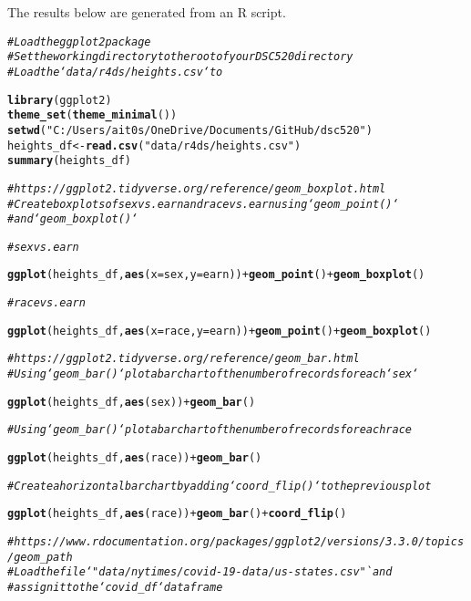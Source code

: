 \documentclass{article}\usepackage[]{graphicx}\usepackage[]{xcolor}
\makeatletter
\newcommand{\hlstr}[1]{\textcolor[rgb]{0.192,0.494,0.8}{#1}}%
\newcommand{\hlcom}[1]{\textcolor[rgb]{0.678,0.584,0.686}{\textit{#1}}}%
\newcommand{\hlkwd}[1]{\textcolor[rgb]{0.737,0.353,0.396}{\textbf{#1}}}%
\newenvironment{kframe}{%
 \def\at@end@of@kframe{}%
 \ifinner\ifhmode%
  \def\at@end@of@kframe{\end{minipage}}%
  \begin{minipage}{\columnwidth}%
 \fi\fi%
 \def\FrameCommand##1{\hskip\@totalleftmargin \hskip-\fboxsep
 \colorbox{shadecolor}{##1}\hskip-\fboxsep
     \hskip-\linewidth \hskip-\@totalleftmargin \hskip\columnwidth}%
 \MakeFramed {\advance\hsize-\width
   \@totalleftmargin\z@ \linewidth\hsize
   \@setminipage}}%
 {\par\unskip\endMakeFramed%
 \at@end@of@kframe}
\newenvironment{knitrout}{}{} %
\makeatother
\begin{document}
The results below are generated from an R script.

\begin{knitrout}
\color{fgcolor}\begin{kframe}
\begin{alltt}
\hlcom{# Load the ggplot2 package}
\hlcom{# Set the working directory to the root of your DSC 520 directory}
\hlcom{# Load the `data/r4ds/heights.csv` to}

\hlkwd{library}(ggplot2)
\hlkwd{theme_set}(\hlkwd{theme_minimal}())
\hlkwd{setwd}(\hlstr{"C:/Users/ait0s/OneDrive/Documents/GitHub/dsc520"})
heights_df <- \hlkwd{read.csv}(\hlstr{"data/r4ds/heights.csv"})
\hlkwd{summary}(heights_df)



\hlcom{# https://ggplot2.tidyverse.org/reference/geom_boxplot.html}
\hlcom{# Create boxplots of sex vs. earn and race vs. earn using `geom_point()` }
\hlcom{# and `geom_boxplot()`}

\hlcom{# sex vs. earn}



\hlkwd{ggplot}(heights_df, \hlkwd{aes}(x=sex, y=earn)) + \hlkwd{geom_point}()+ \hlkwd{geom_boxplot}()


\hlcom{# race vs. earn}

\hlkwd{ggplot}(heights_df, \hlkwd{aes}(x=race, y=earn)) + \hlkwd{geom_point}()+ \hlkwd{geom_boxplot}()


\hlcom{# https://ggplot2.tidyverse.org/reference/geom_bar.html}
\hlcom{# Using `geom_bar()` plot a bar chart of the number of records for each `sex`}



\hlkwd{ggplot}(heights_df, \hlkwd{aes}(sex)) + \hlkwd{geom_bar}()


\hlcom{# Using `geom_bar()` plot a bar chart of the number of records for each race}


\hlkwd{ggplot}(heights_df, \hlkwd{aes}(race)) + \hlkwd{geom_bar}()


\hlcom{# Create a horizontal bar chart by adding `coord_flip()` to the previous plot}


\hlkwd{ggplot}(heights_df, \hlkwd{aes}(race)) + \hlkwd{geom_bar}() + \hlkwd{coord_flip}()


\hlcom{# https://www.rdocumentation.org/packages/ggplot2/versions/3.3.0/topics/geom_path}
\hlcom{# Load the file `"data/nytimes/covid-19-data/us-states.csv"` and}
\hlcom{# assign it to the `covid_df` dataframe}



\end{alltt}
\end{kframe}
\end{knitrout}
\end{document}
